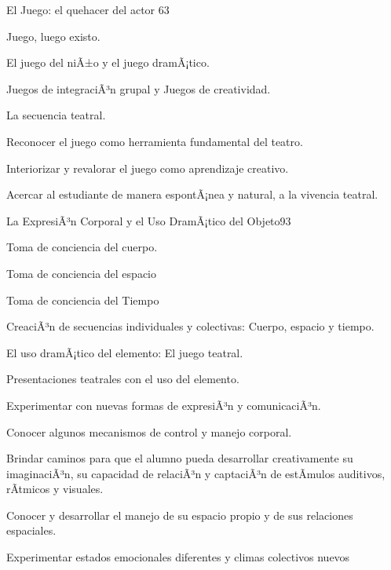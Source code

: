 \begin{syllabus}
\begin{unit}{El Juego: el  quehacer del actor }{}{6}{3}
\begin{topics}
	\item Juego, luego existo.
	\item El juego del niÃ±o y el juego dramÃ¡tico.
	\item Juegos de integraciÃ³n grupal y Juegos de creatividad.
	\item La secuencia teatral.
\end{topics}
\begin{unitgoals}
	\item Reconocer el juego como herramienta fundamental del teatro.
	\item Interiorizar y revalorar el juego como aprendizaje creativo.
	\item Acercar al estudiante de manera espontÃ¡nea y natural, a la vivencia teatral.
\end{unitgoals}
\end{unit}

\begin{unit}{La ExpresiÃ³n Corporal y el Uso DramÃ¡tico del Objeto}{}{9}{3}
\begin{topics}
	\item Toma de conciencia del cuerpo.
	\item Toma de conciencia del espacio
	\item Toma de conciencia del Tiempo
	\item CreaciÃ³n de secuencias individuales y colectivas: Cuerpo, espacio y tiempo.
	\item El uso dramÃ¡tico del elemento: El juego teatral.
	\item Presentaciones teatrales con el uso del elemento.

\end{topics}
\begin{unitgoals}
	\item Experimentar con nuevas formas de expresiÃ³n y comunicaciÃ³n.
	\item Conocer algunos mecanismos de control y manejo corporal.
	\item Brindar caminos para que el alumno pueda desarrollar creativamente su imaginaciÃ³n, su capacidad de relaciÃ³n  y captaciÃ³n de estÃ­mulos auditivos, rÃ­tmicos y visuales.
	\item Conocer y desarrollar el manejo de su espacio propio  y de sus  relaciones  espaciales.
	\item Experimentar  estados emocionales diferentes y climas  colectivos nuevos
\end{unitgoals}
\end{unit}


\end{syllabus}
